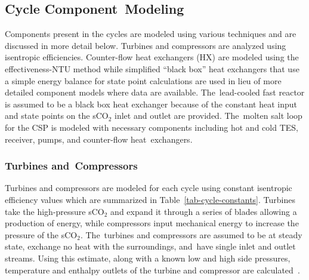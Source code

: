 \documentclass[sustainability,article,accept,moreauthors,pdftex]{Definitions/mdpi}
\begin{document}




\subsection{Cycle Component~Modeling}
Components present in the cycles are modeled using various techniques and are discussed in more detail below. Turbines and compressors are analyzed using isentropic efficiencies. Counter-flow heat exchangers (HX) are modeled using the effectiveness-NTU method while simplified ``black box'' heat exchangers that use a simple energy balance for state point calculations are used in lieu of more detailed component models where data are available. The~lead-cooled fast reactor is assumed to be a black box heat exchanger because of the constant heat input and state points on the sCO$_2$ inlet and outlet are provided. The~molten salt loop for the CSP is modeled with necessary components including hot and cold TES, receiver, pumps, and counter-flow heat~exchangers.



\subsubsection{Turbines and~Compressors }

Turbines and compressors are modeled for each cycle using constant isentropic efficiency values which are summarized in Table~\ref{tab-cycle-constants}. Turbines take the high-pressure sCO$_2$ and expand it through a series of blades allowing a production of energy, while compressors input mechanical energy to increase the pressure of the sCO$_2$. The~turbines and compressors are assumed to be at steady state, exchange no heat with the surroundings, and~have single inlet and outlet streams. Using this estimate, along with a known low and high side pressures, temperature and enthalpy outlets of the turbine and compressor are calculated~\cite{klein_nellis_2011}. 
\end{document}
